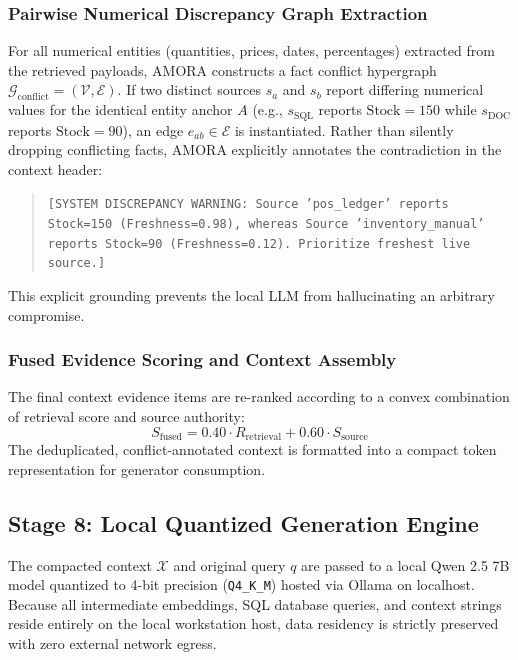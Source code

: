 \subsubsection{Pairwise Numerical Discrepancy Graph Extraction}
For all numerical entities (quantities, prices, dates, percentages) extracted from the retrieved payloads, AMORA constructs a fact conflict hypergraph $\mathcal{G}_{\text{conflict}} = (\mathcal{V}, \mathcal{E})$. If two distinct sources $s_a$ and $s_b$ report differing numerical values for the identical entity anchor $A$ (e.g., $s_{\text{SQL}}$ reports $\text{Stock}=150$ while $s_{\text{DOC}}$ reports $\text{Stock}=90$), an edge $e_{ab} \in \mathcal{E}$ is instantiated. Rather than silently dropping conflicting facts, AMORA explicitly annotates the contradiction in the context header:
\begin{quote}
    \texttt{[SYSTEM DISCREPANCY WARNING: Source 'pos\_ledger' reports Stock=150 (Freshness=0.98), whereas Source 'inventory\_manual' reports Stock=90 (Freshness=0.12). Prioritize freshest live source.]}
\end{quote}
This explicit grounding prevents the local LLM from hallucinating an arbitrary compromise.

\subsubsection{Fused Evidence Scoring and Context Assembly}
The final context evidence items are re-ranked according to a convex combination of retrieval score and source authority:
\begin{equation}
    S_{\text{fused}} = 0.40 \cdot R_{\text{retrieval}} + 0.60 \cdot S_{\text{source}}
    \label{eq:fused_score}
\end{equation}
The deduplicated, conflict-annotated context is formatted into a compact token representation for generator consumption.

\subsection{Stage 8: Local Quantized Generation Engine}
The compacted context $\mathcal{X}$ and original query $q$ are passed to a local Qwen 2.5 7B model quantized to 4-bit precision (\texttt{Q4\_K\_M}) hosted via Ollama on localhost. Because all intermediate embeddings, SQL database queries, and context strings reside entirely on the local workstation host, data residency is strictly preserved with zero external network egress.
